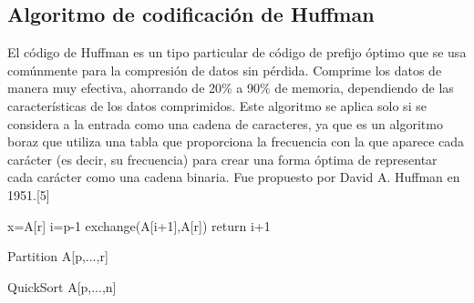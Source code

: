 \documentclass[spanish]{article}
\begin{document}
	\subsection{Algoritmo de codificación de Huffman}
		El código de Huffman es un tipo particular de código de prefijo óptimo que se usa comúnmente para la compresión de datos sin pérdida. Comprime los datos de manera muy efectiva, ahorrando de 20$\%$ a 90$\%$ de memoria, dependiendo de las características de los datos comprimidos. Este algoritmo se aplica solo si se considera a la entrada como una cadena de caracteres, ya que es un algoritmo boraz que utiliza una tabla que proporciona la frecuencia con la que aparece cada carácter (es decir, su frecuencia) para crear una forma óptima de representar cada carácter como una cadena binaria. Fue propuesto por David A. Huffman en 1951.[5]
		\begin{algorithm}[H]
			x=A[r]\;
			i=p-1\;
			exchange(A[i+1],A[r])\;
			return i+1\;
			\caption{Partition A[p,...,r]}
		\end{algorithm}
	\begin{algorithm}[H]
		\caption{QuickSort A[p,...,n]}
	\end{algorithm}
\end{document}
